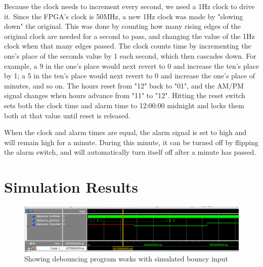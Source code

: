\documentclass[12pt]{article}
\begin{document}
Because the clock needs to increment every second, we need a 1Hz clock to drive it.  Since the FPGA's clock is 50MHz, a new 1Hz clock was made by "slowing down" the original.  This was done by counting how many rising edges of the original clock are needed for a second to pass, and changing the value of the 1Hz clock when that many edges passed.  The clock counts time by incrementing the one's place of the seconds value by 1 each second, which then cascades down.  For example, a 9 in the one's place would next revert to 0 and increase the ten's place by 1; a 5 in the ten's place would next revert to 0 and increase the one's place of minutes, and so on.  The hours reset from "12" back to "01", and the AM/PM signal changes when hours advance from "11" to "12".  Hitting the reset switch sets both the clock time and alarm time to 12:00:00 midnight and locks them both at that value until reset is released.\par
When the clock and alarm times are equal, the alarm signal is set to high and will remain high for a minute.  During this minute, it can be turned off by flipping the alarm switch, and will automatically turn itself off after a minute has passed.

\newpage

\section{Simulation Results} \label{simresults}

\begin{figure}[H]
\begin{center}
\includegraphics[scale=0.6]{debounce_sim.png}
\caption{Showing debouncing program works with simulated bouncy input}
\label{fig:simdb}
\end{center}
\end{figure}

\newpage
\end{document}
